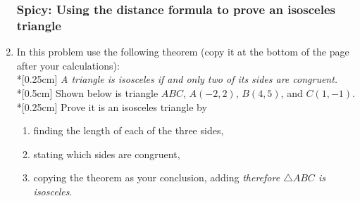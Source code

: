 \documentclass[12pt, twoside]{article}
\begin{document}
\begin{enumerate}
\newpage
  \subsubsection*{Spicy: Using the distance formula to prove an isosceles triangle}
    \item In this problem use the following theorem (copy it at the bottom of the page after your calculations): \\*[0.25cm]
    \emph{A triangle is isosceles if and only two of its sides are congruent.}\\*[0.5cm]
    Shown below is triangle $ABC$, $A(-2,2)$, $B(4,5)$, and $C(1,-1)$. \\*[0.25cm]
    Prove it is an isosceles triangle by
    \begin{enumerate}
      \item finding the length of each of the three sides,
      \item stating which sides are congruent,
      \item copying the theorem as your conclusion, adding \emph{therefore $\triangle ABC$ is isosceles}.
    \end{enumerate}
    \begin{flushright} %
    \end{flushright}


\end{enumerate}
\end{document}
